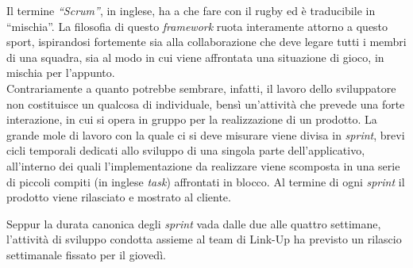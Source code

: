 Il termine \textit{“Scrum”}, in inglese, ha a che fare con il rugby ed è traducibile in “mischia”. La filosofia di questo \textit{framework} ruota interamente attorno a questo sport, ispirandosi fortemente sia alla collaborazione che deve legare tutti i membri di una squadra, sia al modo in cui viene affrontata una situazione di gioco, in mischia per l'appunto.\\
Contrariamente a quanto potrebbe sembrare, infatti, il lavoro dello sviluppatore non costituisce un qualcosa di individuale, bensì un'attività che prevede una forte interazione, in cui si opera in gruppo per la realizzazione di un prodotto. La grande mole di lavoro con la quale ci si deve misurare viene divisa in \textit{sprint}, brevi cicli temporali dedicati allo sviluppo di una singola parte dell'applicativo, all'interno dei quali l'implementazione da realizzare viene scomposta in una serie di piccoli compiti (in inglese \textit{task}) affrontati in blocco. Al termine di ogni \textit{sprint} il prodotto viene rilasciato e mostrato al cliente.

Seppur la durata canonica degli \textit{sprint} vada dalle due alle quattro settimane, l'attività di sviluppo condotta assieme al team di Link-Up ha previsto un rilascio settimanale fissato per il giovedì.

